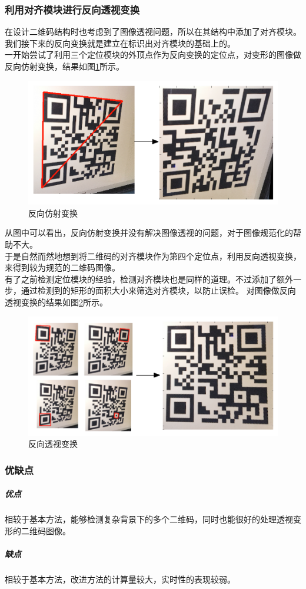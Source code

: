 \subsubsection{利用对齐模块进行反向透视变换}
在设计二维码结构时也考虑到了图像透视问题，所以在其结构中添加了对齐模块。
我们接下来的反向变换就是建立在标识出对齐模块的基础上的。\\
一开始尝试了利用三个定位模块的外顶点作为反向变换的定位点，对变形的图像做反向仿射变换，结果如图\ref{fig:affine}所示。
\begin{figure}[h]
\centering
\includegraphics[width=0.9\linewidth]{affine}
\caption[affine]{反向仿射变换}
\label{fig:affine}
\end{figure}
从图中可以看出，反向仿射变换并没有解决图像透视的问题，对于图像规范化的帮助不大。\\
于是自然而然地想到将二维码的对齐模块作为第四个定位点，利用反向透视变换，来得到较为规范的二维码图像。\\
有了之前检测定位模块的经验，检测对齐模块也是同样的道理。不过添加了额外一步，通过检测到的矩形的面积大小来筛选对齐模块，以防止误检。
对图像做反向透视变换的结果如图\ref{fig:propective}所示。
\begin{figure}[h]
\centering
\includegraphics[width=0.9\linewidth]{propective}
\caption[prospective]{反向透视变换}
\label{fig:propective}
\end{figure}
\subsubsection{优缺点}
\subparagraph{优点}
相较于基本方法，能够检测复杂背景下的多个二维码，同时也能很好的处理透视变形的二维码图像。
\subparagraph{缺点}
相较于基本方法，改进方法的计算量较大，实时性的表现较弱。